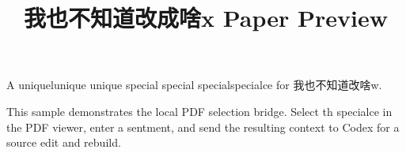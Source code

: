 \documentclass{article}
\title{我也不知道改成啥x Paper Preview}
\author{}
\date{}
\begin{document}
\maketitle

A uniquelunique unique special special specialspecialce for 我也不知道改啥w.

This sample demonstrates the local PDF selection bridge. Select th specialce
in the PDF viewer, enter a sentment, and send the resulting context to
Codex for a source edit and rebuild.
\end{document}
